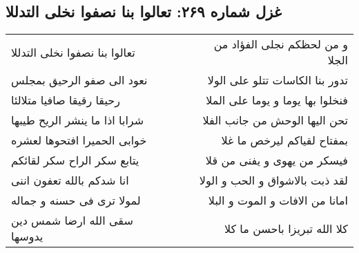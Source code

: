 \begin{center}
\section*{غزل شماره ۲۶۹: تعالوا بنا نصفوا نخلی التدللا}
\label{sec:0269}
\begin{longtable}{l p{0.5cm} r}
تعالوا بنا نصفوا نخلی التدللا
&&
و من لحظکم نجلی الفؤاد من الجلا
\\
نعود الی صفو الرحیق بمجلس
&&
تدور بنا الکاسات تتلو علی الولا
\\
رحیقا رقیقا صافیا متلالئا
&&
فنخلوا بها یوما و یوما علی الملا
\\
شرابا اذا ما ینشر الریح طیبها
&&
تحن الیها الوحش من جانب الفلا
\\
خوابی الحمیرا افتحوها لعشره
&&
بمفتاح لقیاکم لیرخص ما غلا
\\
یتابع سکر الراح سکر لقائکم
&&
فیسکر من یهوی و یفنی من قلا
\\
انا شدکم بالله تعفون اننی
&&
لقد ذبت بالاشواق و الحب و الولا
\\
لمولا تری فی حسنه و جماله
&&
امانا من الافات و الموت و البلا
\\
سقی الله ارضا شمس دین یدوسها
&&
کلا الله تبریزا باحسن ما کلا
\\
\end{longtable}
\end{center}
